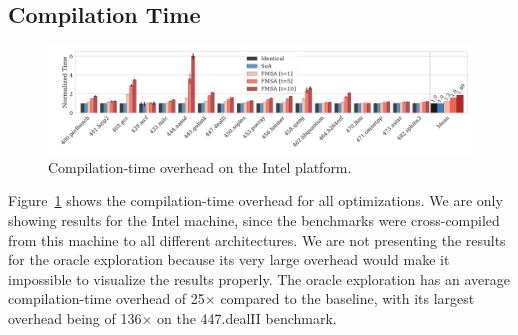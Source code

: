 



\subsection{Compilation Time}

\begin{figure}[th]
  \centering
  \includegraphics[width=\linewidth]{figs/compilation-time.pdf}
  \caption{Compilation-time overhead on the Intel platform.}
  \label{fig:compilation-time}
\end{figure}

Figure~\ref{fig:compilation-time} shows the compilation-time overhead for all
optimizations.
We are only showing results for the Intel machine, since the benchmarks were
cross-compiled from this machine to all different architectures.
We are not presenting the results for the oracle exploration because its very
large overhead would make it impossible to visualize the results properly.
The oracle exploration has an average compilation-time overhead of 25$\times$
compared to the baseline, with its largest overhead being of 136$\times$ on the
447.dealII benchmark.

